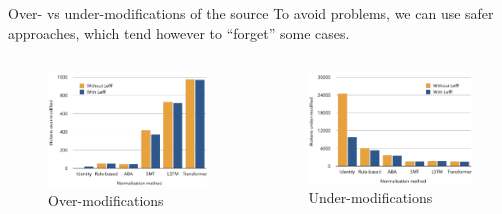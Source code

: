 \documentclass[aspectratio=169]{beamer}
\begin{document}
    \begin{frame}{Over- vs under-modifications of the source}
        \vspace{1em}
        To avoid problems, we can use safer approaches, which tend however to ``forget'' some cases.
        
        \begin{columns}
            \begin{column}{.48\textwidth}
                \begin{figure}
                    \centering
                    \includegraphics[width=\linewidth]{nlp-for-ch/images/overmodifications.pdf}
                    \caption{Over-modifications}
                    \label{fig:overmodifications}
                \end{figure}
            \end{column}
            \begin{column}{.48\textwidth}
                \begin{figure}
                    \centering
                    \includegraphics[width=\linewidth]{nlp-for-ch/images/undermodifications.pdf}
                    \caption{Under-modifications}
                    \label{fig:undermodifications}
                \end{figure}
            \end{column}
        \end{columns}
    \end{frame}
\end{document}

